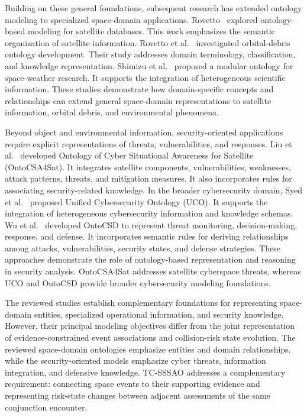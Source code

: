 \documentclass[Royal,sageh,times]{sagej}
\begin{document}
Building on these general foundations, subsequent research has extended ontology modeling to specialized space-domain applications. Rovetto~\citep{rovetto2017ucsso} explored ontology-based modeling for satellite databases. This work emphasizes the semantic organization of satellite information. Rovetto et al.~\citep{rovetto2020debris} investigated orbital-debris ontology development. Their study addresses domain terminology, classification, and knowledge representation. Shimizu et al.~\citep{shimizu2021spaceweather} proposed a modular ontology for space-weather research. It supports the integration of heterogeneous scientific information. These studies demonstrate how domain-specific concepts and relationships can extend general space-domain representations to satellite information, orbital debris, and environmental phenomena.

Beyond object and environmental information, security-oriented applications require explicit representations of threats, vulnerabilities, and responses. Liu et al.~\citep{liu2023ontocsa} developed Ontology of Cyber Situational Awareness for Satellite (OntoCSA4Sat). It integrates satellite components, vulnerabilities, weaknesses, attack patterns, threats, and mitigation measures. It also incorporates rules for associating security-related knowledge. In the broader cybersecurity domain, Syed et al.~\citep{syed2016uco} proposed Unified Cybersecurity Ontology (UCO). It supports the integration of heterogeneous cybersecurity information and knowledge schemas. Wu et al.~\citep{wu2024ontocsd} developed OntoCSD to represent threat monitoring, decision-making, response, and defense. It incorporates semantic rules for deriving relationships among attacks, vulnerabilities, security states, and defense strategies. These approaches demonstrate the role of ontology-based representation and reasoning in security analysis. OntoCSA4Sat addresses satellite cyberspace threats, whereas UCO and OntoCSD provide broader cybersecurity modeling foundations.

The reviewed studies establish complementary foundations for representing space-domain entities, specialized operational information, and security knowledge. However, their principal modeling objectives differ from the joint representation of evidence-constrained event associations and collision-risk state evolution. The reviewed space-domain ontologies emphasize entities and domain relationships, while the security-oriented models emphasize cyber threats, information integration, and defensive knowledge. TC-SSSAO addresses a complementary requirement: connecting space events to their supporting evidence and representing risk-state changes between adjacent assessments of the same conjunction encounter.
\end{document}
